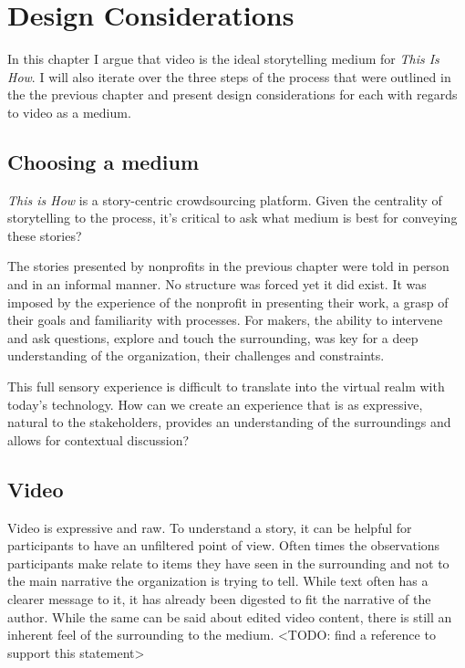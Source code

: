 \chapter{Design Considerations}
\label{chap_design_consider}

In this chapter I argue that video is the ideal storytelling medium for \textit{This Is How}. I will also iterate over the three steps of the process that were outlined in the the previous chapter and present design considerations for each with regards to video as a medium. 

\section{Choosing a medium}

\textit{This is How} is a story-centric crowdsourcing platform. Given the centrality of storytelling to the process, it’s critical to ask what medium is best for conveying these stories?

The stories presented by nonprofits in the previous chapter were told in person and in an informal manner. No structure was forced yet it did exist. It was imposed by the experience of the nonprofit in presenting their work,  a grasp of their goals and familiarity with processes. For makers, the ability to intervene and ask questions, explore and touch the surrounding, was key for a deep understanding of the organization, their challenges and constraints. 

This full sensory experience is difficult to translate into the virtual realm with today's technology. How can we create an experience that is as expressive, natural to the stakeholders, provides an understanding of the surroundings and allows for contextual discussion?

\section{Video}

Video is expressive and raw. To understand a story, it can be helpful for participants to have an unfiltered point of view. Often times the observations participants make relate to items they have seen in the surrounding and not to the main narrative the organization is trying to tell. While text often has a clearer message to it, it has already been digested to fit the narrative of the author. While the same can be said about edited video content, there is still an inherent feel of the surrounding to the medium. <TODO: find a  reference to support this statement>

